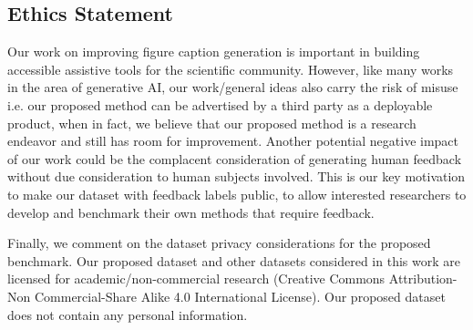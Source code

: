 \documentclass[11pt]{article}
\newcommand{\ryan}[1]{\textcolor{blue}{~Ryan:~#1}}
\begin{document}
\subsection{Ethics Statement} \label{sec:eth}
Our work on improving figure caption generation is important in building accessible assistive tools for the scientific community. However, like many works in the area of generative AI, our work/general ideas also carry the risk of misuse i.e. our proposed method can be advertised by a third party as a deployable product, when in fact, we believe that our proposed method is a research endeavor and still has room for improvement. Another potential negative impact of our work could be the complacent consideration of generating human feedback without due consideration to human subjects involved. This is our key motivation to make our dataset with feedback labels public, to allow interested researchers to develop and benchmark their own methods that require feedback.

Finally, we comment on the dataset privacy considerations for the proposed benchmark. Our proposed dataset and other datasets considered in this work are licensed for academic/non-commercial research (Creative Commons Attribution-Non Commercial-Share Alike 4.0 International License). Our proposed dataset does not contain any personal information. 




\end{document}
